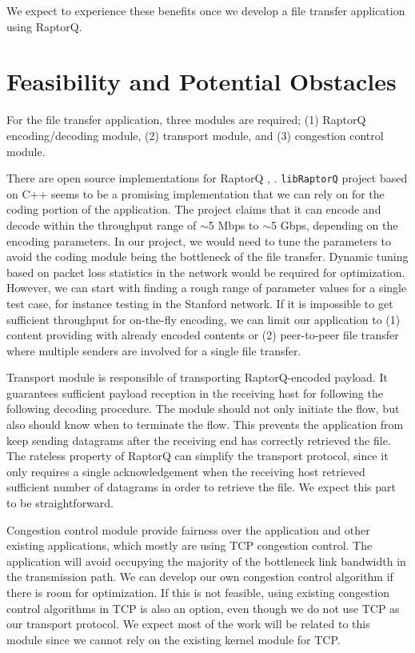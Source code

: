 \documentclass{sig-alternate-10pt}
\begin{document}
We expect to experience these benefits once we develop a file transfer
application using RaptorQ.

\section{Feasibility and Potential Obstacles}
For the file transfer application, three modules are required; (1) RaptorQ
encoding/decoding module, (2) transport module, and (3) congestion control
module. 

There are open source implementations for RaptorQ \cite{openrq},
\cite{libraptorq}. \texttt{libRaptorQ} project \cite{libraptorq} based on C++
seems to be a promising implementation that we can rely on for the coding
portion of the application. The project claims that it can encode and decode
within the throughput range of $\sim$5 Mbps to $\sim$5 Gbps, depending on the encoding
parameters. In our project, we would need to tune the parameters to avoid the
coding module being the bottleneck of the file transfer.  Dynamic tuning based
on packet loss statistics in the network would be required for optimization.
However, we can start with finding a rough range of parameter values for a
single test case, for instance testing in the Stanford network. If it is
impossible to get sufficient throughput for on-the-fly encoding, we can limit
our application to (1) content providing with already encoded contents or (2)
peer-to-peer file transfer where multiple senders are involved for a single file
transfer.

Transport module is responsible of transporting RaptorQ-encoded payload. It
guarantees sufficient payload reception in the receiving host for following the
following decoding procedure. The module should not only initiate the flow, but
also should know when to terminate the flow. This prevents the application from
keep sending datagrams after the receiving end has correctly retrieved the file.
The rateless property of RaptorQ can simplify the transport protocol, since it
only requires a single acknowledgement when the receiving host retrieved
sufficient number of datagrams in order to retrieve the file. We expect this
part to be straightforward.

Congestion control module provide fairness over the application and other
existing applications, which mostly are using TCP congestion control. The
application will avoid occupying the majority of the bottleneck link bandwidth in
the transmission path. We can develop our own congestion control algorithm if
there is room for optimization. If this is not feasible, using existing
congestion control algorithms in TCP is also an option, even though we do not
use TCP as our transport protocol. We expect most of the work will be related to
this module since we cannot rely on the existing kernel module for TCP.
\end{document}
